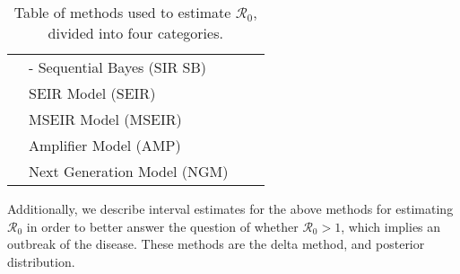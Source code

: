 \documentclass[12pt]{article}
\newcommand{\rr}{\ensuremath{\mathcal{R}_0}}
\begin{document}
\begin{table}[h]
{\begin{tabular}{@{}llll@{}}
                                  & - Sequential Bayes (SIR SB)            &                                                   &                          \\
                                  & SEIR Model (SEIR)                      &                                                   &                          \\
                                  & MSEIR Model (MSEIR)                    &                                                   &                          \\
                                  & Amplifier Model (AMP)                  &                                                   &                          \\
                                  & Next Generation Model (NGM)            &                                                   &                          \\ \bottomrule
\end{tabular}
}
\caption{Table of methods used to estimate $\rr$, divided into four categories.}
\label{tab:methods}
\end{table}

Additionally, we describe  interval estimates for the above methods for estimating $\rr$ in order to better answer the question of whether $\rr > 1$, which implies an outbreak of the disease.  These methods are the delta method, and posterior distribution.
\end{document}
